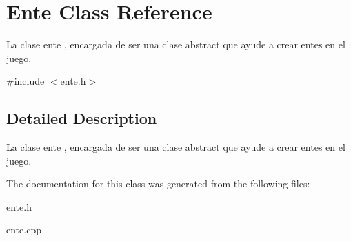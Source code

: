 \hypertarget{classEnte}{\section{Ente Class Reference}
\label{classEnte}
}


La clase ente , encargada de ser una clase abstract que ayude a crear entes en el juego.  




{\ttfamily \#include $<$ente.\+h$>$}



\subsection{Detailed Description}
La clase ente , encargada de ser una clase abstract que ayude a crear entes en el juego. 

The documentation for this class was generated from the following files\+:\begin{DoxyCompactItemize}
\item 
ente.\+h\item 
ente.\+cpp\end{DoxyCompactItemize}
